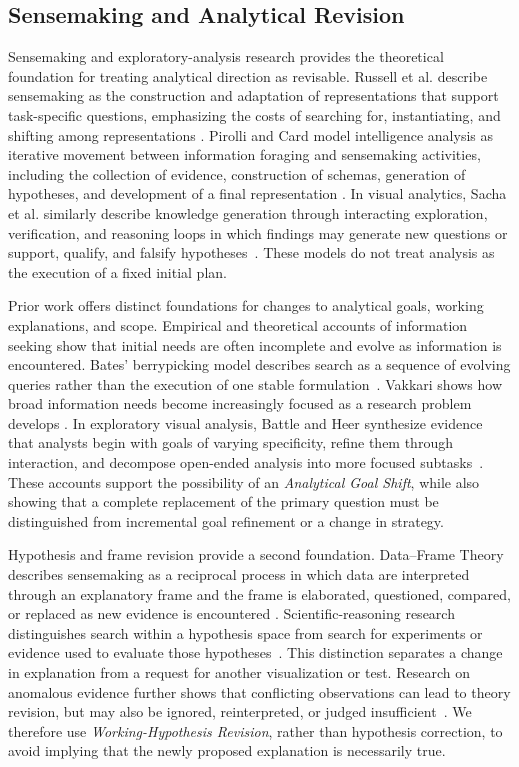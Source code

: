 \documentclass[journal]{IEEEtran}
\begin{document}
\subsection{Sensemaking and Analytical Revision}
\label{sec:rw-sensemaking}

Sensemaking and exploratory-analysis research provides the theoretical
foundation for treating analytical direction as revisable. Russell et al.
describe sensemaking as the construction and adaptation of representations
that support task-specific questions, emphasizing the costs of searching for,
instantiating, and shifting among representations
\cite{russell1993cost}. Pirolli and Card model intelligence analysis as
iterative movement between information foraging and sensemaking activities,
including the collection of evidence, construction of schemas, generation of
hypotheses, and development of a final representation
\cite{pirolli2005sensemaking}. In visual analytics, Sacha et al. similarly
describe knowledge generation through interacting exploration, verification,
and reasoning loops in which findings may generate new questions or support,
qualify, and falsify hypotheses~\cite{sacha2014knowledge}. These models do not
treat analysis as the execution of a fixed initial plan.

Prior work offers distinct foundations for changes to analytical goals,
working explanations, and scope. Empirical and theoretical accounts of
information seeking show that initial needs are often incomplete and evolve as
information is encountered. Bates' berrypicking model describes search as a
sequence of evolving queries rather than the execution of one stable
formulation~\cite{bates1989berrypicking}. Vakkari shows how broad information
needs become increasingly focused as a research problem develops
\cite{vakkari2001changes}. In exploratory visual analysis, Battle and Heer
synthesize evidence that analysts begin with goals of varying specificity,
refine them through interaction, and decompose open-ended analysis into more
focused subtasks~\cite{battle2019characterizing}. These accounts support the
possibility of an \emph{Analytical Goal Shift}, while also showing that a
complete replacement of the primary question must be distinguished from
incremental goal refinement or a change in strategy.

Hypothesis and frame revision provide a second foundation. Data--Frame Theory
describes sensemaking as a reciprocal process in which data are interpreted
through an explanatory frame and the frame is elaborated, questioned,
compared, or replaced as new evidence is encountered
\cite{klein2007dataframe}. Scientific-reasoning research distinguishes search
within a hypothesis space from search for experiments or evidence used to
evaluate those hypotheses~\cite{klahr1988dual}. This distinction separates a
change in explanation from a request for another visualization or test.
Research on anomalous evidence further shows that conflicting observations
can lead to theory revision, but may also be ignored, reinterpreted, or judged
insufficient~\cite{chinn1993anomalous}. We therefore use
\emph{Working-Hypothesis Revision}, rather than hypothesis correction, to
avoid implying that the newly proposed explanation is necessarily true.
\end{document}
